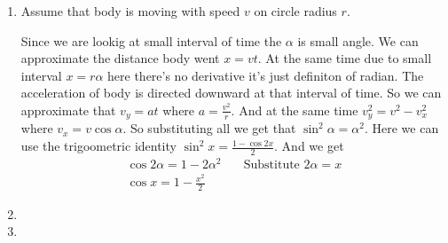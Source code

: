\begin{sol}
    \begin{enumerate}[label=\textbf{(\alph*)}]
        \item 
        Assume that body is moving with speed $v$ on circle radius $r$. 
        \begin{center}
        \end{center}
        Since we are lookig at small interval of time the $\alpha$ is small angle. We can approximate the distance body went $x=vt$. At the same time due to small interval $x=r\alpha$ here there's no derivative it's just definiton of radian.
        The acceleration of body is directed downward at that interval of time. So we can approximate that $v_y=at$ where $a=\frac{v^2}{r}$. And at the same time $v_y^2=v^2-v_x^2$ where $v_x=v\cos\alpha$.
        So substituting all we get that $\sin^2\alpha=\alpha^2$. Here we can use the trigoometric identity $\sin^2 x=\frac{1-\cos 2x}{2}$. And we get
        \begin{align*}
            \cos 2\alpha=1-2\alpha^2 &\quad \text{Substitute $2\alpha=x$}\\
            \cos x=1-\frac{x^2}{2}&
        \end{align*}
        \item
        \item
    \end{enumerate}
\vspace{15mm}
\end{sol}